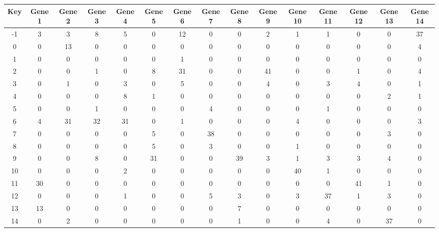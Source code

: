 \begin{tabular}{|c|c|c|c|c|c|c|c|c|c|c|c|c|c|c|}
\hline
Key & Gene 1 & Gene 2 & Gene 3 & Gene 4 & Gene 5 & Gene 6 & Gene 7 & Gene 8 & Gene 9 & Gene 10 & Gene 11 & Gene 12 & Gene 13 & Gene 14 \\
\hline
-1 & 3 & 3 & 8 & 5 & 0 & 12 & 0 & 0 & 2 & 1 & 1 & 0 & 0 & 37 \\
0 & 0 & 13 & 0 & 0 & 0 & 0 & 0 & 0 & 0 & 0 & 0 & 0 & 0 & 4 \\
1 & 0 & 0 & 0 & 0 & 0 & 1 & 0 & 0 & 0 & 0 & 0 & 0 & 0 & 0 \\
2 & 0 & 0 & 1 & 0 & 8 & 31 & 0 & 0 & 41 & 0 & 0 & 1 & 0 & 4 \\
3 & 0 & 1 & 0 & 3 & 0 & 5 & 0 & 0 & 4 & 0 & 3 & 4 & 0 & 1 \\
4 & 0 & 0 & 0 & 8 & 1 & 0 & 0 & 0 & 0 & 0 & 0 & 0 & 2 & 1 \\
5 & 0 & 0 & 1 & 0 & 0 & 0 & 4 & 0 & 0 & 0 & 1 & 0 & 0 & 0 \\
6 & 4 & 31 & 32 & 31 & 0 & 1 & 0 & 0 & 0 & 4 & 0 & 0 & 0 & 3 \\
7 & 0 & 0 & 0 & 0 & 5 & 0 & 38 & 0 & 0 & 0 & 0 & 0 & 3 & 0 \\
8 & 0 & 0 & 0 & 0 & 5 & 0 & 3 & 0 & 0 & 1 & 0 & 0 & 0 & 0 \\
9 & 0 & 0 & 8 & 0 & 31 & 0 & 0 & 39 & 3 & 1 & 3 & 3 & 4 & 0 \\
10 & 0 & 0 & 0 & 2 & 0 & 0 & 0 & 0 & 0 & 40 & 1 & 0 & 0 & 0 \\
11 & 30 & 0 & 0 & 0 & 0 & 0 & 0 & 0 & 0 & 0 & 0 & 41 & 1 & 0 \\
12 & 0 & 0 & 0 & 1 & 0 & 0 & 5 & 3 & 0 & 3 & 37 & 1 & 3 & 0 \\
13 & 13 & 0 & 0 & 0 & 0 & 0 & 0 & 7 & 0 & 0 & 0 & 0 & 0 & 0 \\
14 & 0 & 2 & 0 & 0 & 0 & 0 & 0 & 1 & 0 & 0 & 4 & 0 & 37 & 0 \\
\hline
\end{tabular}